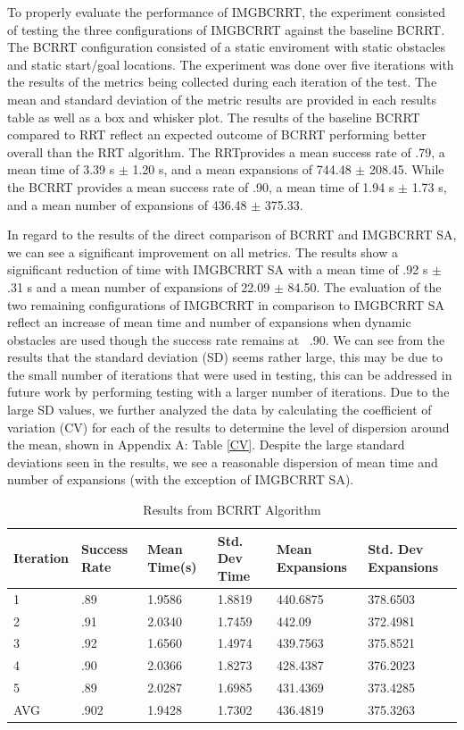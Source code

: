 \documentclass{article}
\begin{document}
To properly evaluate the performance of IMGBCRRT, the experiment consisted of testing the three configurations of IMGBCRRT against the baseline BCRRT. The BCRRT configuration consisted of a static enviroment with static obstacles and static start/goal locations. The experiment was done over five iterations with the results of the metrics being collected during each iteration of the test. The mean and standard deviation of the metric results are provided in each results table as well as a box and whisker plot. The results of the baseline BCRRT compared to RRT reflect an expected outcome of  BCRRT performing better overall than the RRT algorithm. The RRTprovides a mean success rate of .79, a mean time of 3.39 s $\pm$ 1.20 s, and a mean expansions of 744.48 $\pm$ 208.45. While the BCRRT provides a mean success rate of .90, a mean time of 1.94 s $\pm$ 1.73 s, and a mean number of expansions of 436.48 $\pm$ 375.33.

In regard to the results of the direct comparison of BCRRT and IMGBCRRT SA, we can see a significant improvement on all metrics. The results show a significant reduction of time with IMGBCRRT SA with a mean time of .92 s $\pm$ .31 s and a mean number of expansions of 22.09 $\pm$ 84.50. The evaluation of the two remaining configurations of IMGBCRRT in comparison to IMGBCRRT SA reflect an increase of mean time and number of expansions when dynamic obstacles are used though the success rate remains at ~.90. We can see from the results that the standard deviation (SD) seems rather large, this may be due to the small number of iterations that were used in testing, this can be addressed in future work by performing testing with a larger number of iterations. Due to the large SD values, we further analyzed the data by calculating the coefficient of variation (CV) for each of the results to determine the level of dispersion around the mean, shown in Appendix A: Table \ref{CV}. Despite the large standard deviations seen in the results, we see a reasonable dispersion of mean time and number of expansions (with the exception of IMGBCRRT SA). 

\begin{table}[h]
  \caption{Results from BCRRT Algorithm}
  \label{BCRRT Results}
  \centering
  \begin{tabular}{llllll}
    \cmidrule(r){1-6}
   Iteration & Success Rate & Mean Time(s) & Std. Dev Time & Mean Expansions & Std. Dev Expansions\\
    \midrule
    1 & .89 & 1.9586 & 1.8819 & 440.6875 & 378.6503 \\
    2 & .91 & 2.0340 & 1.7459 & 442.09 & 372.4981 \\
    3 & .92 & 1.6560 & 1.4974 & 439.7563 & 375.8521 \\
    4 & .90 & 2.0366 & 1.8273 & 428.4387 & 376.2023 \\
    5 & .89 & 2.0287 & 1.6985 & 431.4369 & 373.4285 \\
 \midrule
  AVG & .902 & 1.9428 & 1.7302 & 436.4819 & 375.3263 \\
    \bottomrule
  \end{tabular}
\end{table}
\end{document}
